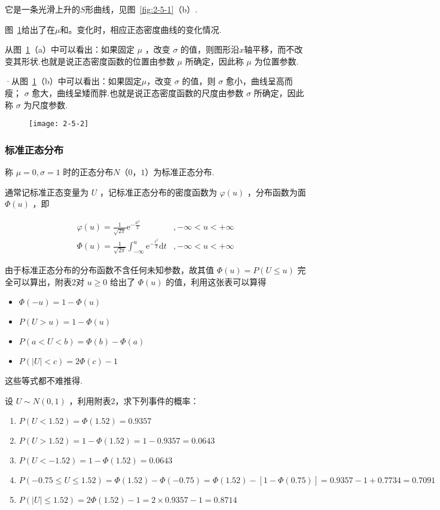 它是一条光滑上升的$ S $形曲线，见图~\ref{fig:2-5-1}（b）.

图~\ref{fig:2-5-2}给出了在$ \mu $和。变化时，相应正态密度曲线的变化情况.

从图~\ref{fig:2-5-2}（a）中可以看出：如果固定 $\mu$ ，改变 $\sigma $ 的值，则图形沿$ x $轴平移，而不改变其形状.也就是说正态密度函数的位置由参数 $\mu$ 所确定，因此称 $\mu$ 为位置参数.

·从图~\ref{fig:2-5-2}（b）中可以看出：如果固定$ \mu $，改变 $\sigma$ 的值，则 $\sigma$ 愈小，曲线呈高而瘦； $\sigma$ 愈大，曲线呈矮而胖.也就是说正态密度函数的尺度由参数 $\sigma$ 所确定，因此称 $\sigma$ 为尺度参数.

\begin{figure}
	\centering
	\texttt{[image: 2-5-2]}
	\caption{}
	\label{fig:2-5-2}
\end{figure}

\subsubsection{标准正态分布}

称 $\mu=0, \sigma=1$ 时的正态分布$ N（0，1） $为标准正态分布.

通常记标准正态变量为 $ U $ ，记标准正态分布的密度函数为 $\varphi(u)$ ，分布函数为面 $\Phi(u)$ ，即

\[
\begin{array}{ll}
{\varphi(u)=\frac{1}{\sqrt{2 \pi}} \mathrm{e}^{-\frac{\mu^{2}}{2}}} & {,-\infty<u<+\infty} \\ 
{\Phi(u)=\frac{1}{\sqrt{2 \pi}} \int_{-\infty}^{u} \mathrm{e}^{-\frac{t^{2}}{2}} \mathrm{d} t} & {,-\infty<u<+\infty}
\end{array}
\]

由于标准正态分布的分布函数不含任何未知参数，故其值 $\Phi(u)=P(U \leqslant u ) $ 完全可以算出，附表2对 $u \geqslant 0$ 给出了 $\Phi(u)$ 的值，利用这张表可以算得
\begin{itemize}
	\item $\Phi(-u)=1-\Phi(u)$
	\item $P(U>u)=1-\Phi(u)$
	\item $P(a<U<b)=\Phi(b)-\Phi(a)$
	\item $P(|U|<c)=2 \Phi(c)-1$
\end{itemize}

这些等式都不难推得.

\begin{example}
	设 $U \sim N(0,1)$ ，利用附表2，求下列事件的概率：
	
	\begin{enumerate}
		\item $ P(U<1.52)=\Phi(1.52)=0.9357 $
		\item $ P(U>1.52)=1-\Phi(1.52)=1-0.9357=0.0643 $
		\item $ P(U<-1.52)=1-\Phi(1.52)=0.0643 $
		\item $ P(-0.75 \leqslant U \leqslant 1.52)=\Phi(1.52)-\Phi(-0.75)=\Phi(1.52)-[1- \Phi(0.75) ]=0.9357-1+0.7734=0.7091 $
		\item $ P(|U| \leqslant 1.52)=2 \Phi(1.52)-1=2 \times 0.9357-1=0.8714 $
	\end{enumerate}
\end{example}

